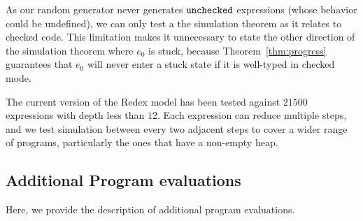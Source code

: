 
As our random generator never generates
$\mathtt{unchecked}$ expressions (whose behavior could be undefined), we can only test a the simulation theorem 
as it relates to checked code. This limitation makes it
unnecessary to state the other direction of the simulation theorem
where $e_0$ is stuck, because Theorem~\ref{thm:progress} guarantees
that $e_0$ will never enter a stuck state if it is well-typed in
checked mode.

The current version of the Redex model has been tested against $21500$
expressions with depth less than $12$. Each expression can
reduce multiple steps, and we test simulation between every two
adjacent steps to cover a wider range of programs, particularly the
ones that have a non-empty heap.

\subsection{Additional Program evaluations}\label{appx:add-prog-eval}

Here, we provide the description of additional program evaluations.

